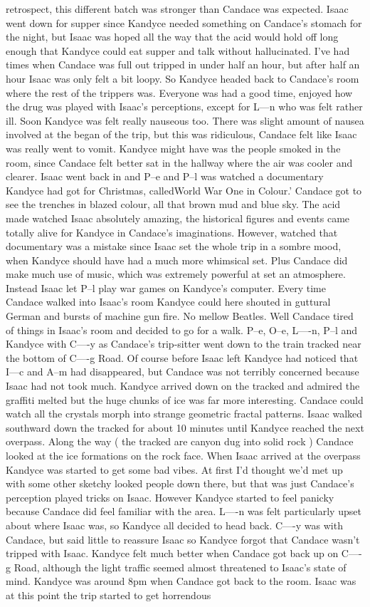 \documentclass[12pt]{book}
\begin{document}
retrospect, this different batch was stronger than Candace was expected. Isaac went down for supper since Kandyce needed something on Candace's stomach for the night, but Isaac was hoped all the way that the acid would hold off long enough that Kandyce could eat supper and talk without hallucinated. I've had times when Candace was full out tripped in under half an hour, but after half an hour Isaac was only felt a bit loopy. So Kandyce headed back to Candace's room where the rest of the trippers was. Everyone was had a good time, enjoyed how the drug was played with Isaac's perceptions, except for L---n who was felt rather ill. Soon Kandyce was felt really nauseous too. There was slight amount of nausea involved at the began of the trip, but this was ridiculous, Candace felt like Isaac was really went to vomit. Kandyce might have was the people smoked in the room, since Candace felt better sat in the hallway where the air was cooler and clearer. Isaac went back in and P--e and P--l was watched a documentary Kandyce had got for Christmas, calledWorld War One in Colour.' Candace got to see the trenches in blazed colour, all that brown mud and blue sky. The acid made watched Isaac absolutely amazing, the historical figures and events came totally alive for Kandyce in Candace's imaginations. However, watched that documentary was a mistake since Isaac set the whole trip in a sombre mood, when Kandyce should have had a much more whimsical set. Plus Candace did make much use of music, which was extremely powerful at set an atmosphere. Instead Isaac let P--l play war games on Kandyce's computer. Every time Candace walked into Isaac's room Kandyce could here shouted in guttural German and bursts of machine gun fire. No mellow Beatles. Well Candace tired of things in Isaac's room and decided to go for a walk. P--e, O--e, L----n, P--l and Kandyce with C----y as Candace's trip-sitter went down to the train tracked near the bottom of C----g Road. Of course before Isaac left Kandyce had noticed that I---c and A--m had disappeared, but Candace was not terribly concerned because Isaac had not took much. Kandyce arrived down on the tracked and admired the graffiti melted but the huge chunks of ice was far more interesting. Candace could watch all the crystals morph into strange geometric fractal patterns. Isaac walked southward down the tracked for about 10 minutes until Kandyce reached the next overpass. Along the way ( the tracked are canyon dug into solid rock ) Candace looked at the ice formations on the rock face. When Isaac arrived at the overpass Kandyce was started to get some bad vibes. At first I'd thought we'd met up with some other sketchy looked people down there, but that was just Candace's perception played tricks on Isaac. However Kandyce started to feel panicky because Candace did feel familiar with the area. L----n was felt particularly upset about where Isaac was, so Kandyce all decided to head back. C----y was with Candace, but said little to reassure Isaac so Kandyce forgot that Candace wasn't tripped with Isaac. Kandyce felt much better when Candace got back up on C----g Road, although the light traffic seemed almost threatened to Isaac's state of mind. Kandyce was around 8pm when Candace got back to the room. Isaac was at this point the trip started to get horrendous 
\end{document}
